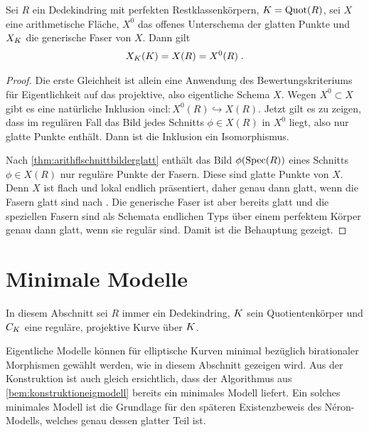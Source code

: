 \begin{Satz}\label{thm:ratpkteregulaeremodelle}
  Sei $R$ ein Dedekindring
  mit perfekten Restklassenkörpern,
  $K=\operatorname{Quot}(R)$,
  sei $X$ eine arithmetische Fläche,
  $X^0$ das offenes Unterschema der glatten Punkte und
  $X_{K}$ die generische Faser von $X$.
  Dann gilt
  \begin{gather*}
    X_{K}(K)=X(R)=X^0(R)\;.
  \end{gather*}
  \begin{proof}
    Die erste Gleichheit ist allein eine Anwendung des
    Bewertungskriteriums für Eigentlichkeit auf das projektive, also
    eigentliche Schema $X$.
    Wegen $X^0\subset X$ gibt es eine natürliche Inklusion
    $\circ \text{incl}\colon X^0(R)\hookrightarrow X(R)$.
    Jetzt gilt es zu zeigen, dass im regulären Fall das Bild jedes
    Schnitts $\phi\in X(R)$ in $X^0$ liegt, also nur glatte Punkte
    enthält. Dann ist die Inklusion ein Isomorphismus.
    
    Nach \ref{thm:arithflschnittbilderglatt} enthält das Bild
    $\phi(\operatorname{Spec}(R))$ eines Schnitts $\phi\in X(R)$ nur reguläre
    Punkte der Fasern. Diese sind glatte Punkte von $X$. Denn
    $X$ ist flach und lokal endlich präsentiert, daher genau dann
    glatt, wenn die Fasern glatt sind nach
    \cite[Proposition~8.5/17]{bosch}.
    Die generische Faser ist aber bereits glatt und die speziellen
    Fasern sind als Schemata endlichen Typs über einem perfektem
    Körper genau dann glatt, wenn sie regulär sind.
    Damit ist die Behauptung gezeigt.
  \end{proof}
\end{Satz}


\section{Minimale Modelle}\label{chap:minmodelle}
In diesem Abschnitt sei $R$ immer ein Dedekindring,
$K$ sein Quotientenkörper und $C_{K}$ eine
reguläre, projektive Kurve über $K$.

Eigentliche Modelle können für elliptische Kurven minimal
bezüglich birationaler Morphismen gewählt werden, wie in diesem
Abschnitt gezeigen wird. Aus der Konstruktion ist auch gleich ersichtlich,
dass der Algorithmus aus \ref{bem:konstruktioneigmodell} bereits ein
minimales Modell liefert.
Ein solches minimales Modell ist die Grundlage für den späteren
Existenzbeweis des Néron-Modells, welches genau dessen glatter Teil
ist.

